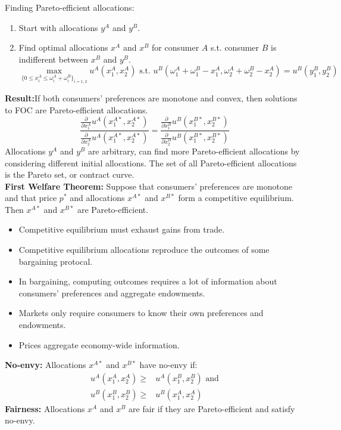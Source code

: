 \documentclass[12pt]{article}
\newcommand{\di}{\partial}
\newcommand{\opxoa}{x^{A\ast}_1}
\newcommand{\opxta}{x^{A\ast}_2}
\newcommand{\opxob}{x^{B\ast}_1}
\newcommand{\opxtb}{x^{B\ast}_2}
\newcommand{\opxa}{x^{A\ast}}
\newcommand{\opxb}{x^{B\ast}}
\newcommand{\opp}{p^{\ast}}
\begin{document}
\noindent
Finding Pareto-efficient allocations:
\begin{enumerate}
	\item Start with allocations $y^A$ and $y^B$.
	\item Find optimal allocations $x^A$ and $x^B$ for consumer $A$ s.t. consumer $B$ is indifferent between $x^B$ and $y^B$. 
	\[ \max_{\{ 0\leq x^A_i \leq \omega^A_i+\omega^B_i  \}_{i=1,2}} u^{A}(x^{A}_1, x^{A}_2) \text{ s.t. } u^B(\omega^A_1+\omega^B_1 - x^A_1, \omega^A_2+\omega^B_2-x^A_2) = u^B(y^B_1, y^B_2)
	\]
\end{enumerate}
\textbf{Result:}If both consumers' preferences are monotone and convex, then solutions to FOC are Pareto-efficient allocations. \\
	\[
\frac{\frac{\di}{\di x^A_1}u^A(\opxoa, \opxta)}{\frac{\di}{\di x^A_2}u^A(\opxoa, \opxta)} = \frac{\frac{\di}{\di x^B_1}u^B(\opxob, \opxtb)}{\frac{\di}{\di x^B_2}u^B(\opxob, \opxtb)}
\]
Allocations $y^A$ and $y^B$ are arbitrary, can find more Pareto-efficient allocations by considering different initial allocations. The set of all Pareto-efficient allocations is the Pareto set, or contract curve. \\

\noindent
\textbf{First Welfare Theorem:} Suppose that consumers' preferences are monotone and that price $\opp$ and allocations $\opxa$ and $\opxb$ form a competitive equilibrium. Then $\opxa$ and $\opxb$ are Pareto-efficient.\\
\begin{itemize}
	\item Competitive equilibrium must exhaust gains from trade.
	\item Competitive equilibrium allocations reproduce the outcomes of some bargaining protocal.
    \item In bargaining, computing outcomes requires a lot of information about consumers' preferences and aggregate endowments. 
    \item Markets only require consumers to know their own preferences and endowments. 
    \item Prices aggregate economy-wide information. 
\end{itemize}

\noindent
\textbf{No-envy:} Allocations $\opxa$ and $\opxb$ have no-envy if:
\begin{align*}
u^A(x^A_1, x^A_2) \geq& u^A(x^B_1, x^B_2) \text{ and}\\
u^B(x^B_1, x^B_2) \geq& u^B(x^A_1, x^A_2)
\end{align*}
\textbf{Fairness:} Allocations $x^A$ and $x^B$ are fair if they are Pareto-efficient and satisfy no-envy.\\
\end{document}
